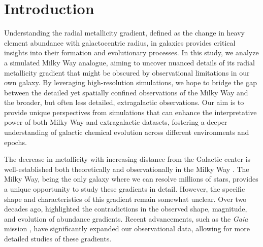 \documentclass[fleqn,usenatbib]{mnras}
\begin{document}
\section{Introduction}
\label{sec:intro}

Understanding the radial metallicity gradient, defined as the change in heavy element abundance with galactocentric radius, in galaxies provides critical insights into their formation and evolutionary processes. In this study, we analyze a simulated Milky Way analogue, aiming to uncover nuanced details of its radial metallicity gradient that might be obscured by observational limitations in our own galaxy. By leveraging high-resolution simulations, we hope to bridge the gap between the detailed yet spatially confined observations of the Milky Way and the broader, but often less detailed, extragalactic observations. Our aim is to provide unique perspectives from simulations that can enhance the interpretative power of both Milky Way and extragalactic datasets, fostering a deeper understanding of galactic chemical evolution across different environments and epochs.

The decrease in metallicity with increasing distance from the Galactic center is well-established both theoretically \citep{Larson1976, Tinsley1980, Chiosi1980} and observationally in the Milky Way \citep{Searle1971, Janes1979, Twarog1997}. The Milky Way, being the only galaxy where we can resolve millions of stars, provides a unique opportunity to study these gradients in detail. However, the specific shape and characteristics of this gradient remain somewhat unclear. Over two decades ago, \citet{Chiappini2002} highlighted the contradictions in the observed shape, magnitude, and evolution of abundance gradients. Recent advancements, such as the \textit{Gaia} mission \citep{Gaia-Collaboration2016}, have significantly expanded our observational data, allowing for more detailed studies of these gradients.
\end{document}
